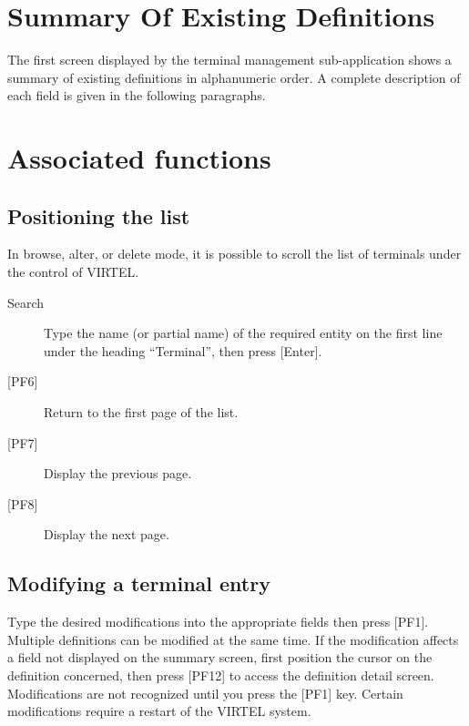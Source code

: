 \documentclass[letterpaper,10pt,english]{sphinxmanual}
\begin{document}
\section{Summary Of Existing Definitions}
\label{\detokenize{connectivity_guide:summary-of-existing-definitions}}
The first screen displayed by the terminal management sub-application shows a summary of existing definitions in alphanumeric order. A complete description of each field is given in the following paragraphs.




\section{Associated functions}
\label{\detokenize{connectivity_guide:associated-functions}}

\subsection{Positioning the list}
\label{\detokenize{connectivity_guide:positioning-the-list}}
In browse, alter, or delete mode, it is possible to scroll the list of terminals under the control of VIRTEL.
\begin{description}
\item[{Search}] \leavevmode
Type the name (or partial name) of the required entity on the first line under the heading “Terminal”, then press {[}Enter{]}.

\item[{{[}PF6{]}}] \leavevmode
Return to the first page of the list.

\item[{{[}PF7{]}}] \leavevmode
Display the previous page.

\item[{{[}PF8{]}}] \leavevmode
Display the next page.

\end{description}


\subsection{Modifying a terminal entry}
\label{\detokenize{connectivity_guide:modifying-a-terminal-entry}}
Type the desired modifications into the appropriate fields then press {[}PF1{]}. Multiple definitions can be modified at the same time. If the modification affects a field not displayed on the summary screen, first position the cursor on the definition concerned, then press {[}PF12{]} to access the definition detail screen. Modifications are not recognized until you press the {[}PF1{]} key. Certain modifications require a restart of the VIRTEL
system.
\end{document}
